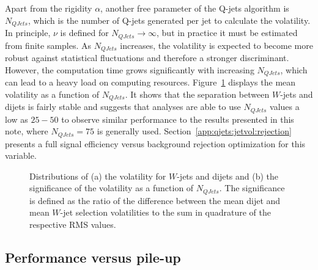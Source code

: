 Apart from the rigidity $\alpha$, another free parameter of the Q-jets algorithm is $N_{QJets}$, which is the number of Q-jets generated per jet to calculate the volatility. In principle, $\nu$ is defined for $N_{QJets}\to\infty$, but in practice it must be  estimated from finite samples. As $N_{QJets}$ increases, the volatility is expected to become more robust against statistical fluctuations and therefore a stronger discriminant. However, the computation time grows significantly with increasing $N_{QJets}$, which can lead to a heavy load on computing resources. Figure~\ref{fig:Vol_vs_NQJets} displays the mean volatility as a function of $N_{QJets}$. It shows that the separation between $W$-jets and dijets is fairly stable and suggests that analyses are able to use $N_{QJets}$ values a low as $25-50$ to observe similar performance to the results presented in this note, where $N_{QJets}=75$ is generally used. Section~\ref{app:qjets:jetvol:rejection} presents a full signal efficiency versus background rejection optimization for this variable. %

\begin{figure}[htbp]
\centering
{}
\caption{Distributions of (a) the volatility for $W$-jets and dijets and (b) the significance of the volatility  as a function of $N_{QJets}$. The significance is defined as the ratio of the difference between the mean dijet and mean $W$-jet selection volatilities to the sum in quadrature of the respective RMS values.}%
\label{fig:Vol_vs_NQJets}
\end{figure}

\subsection{Performance versus pile-up}
\label{app:qjets:jetvol:pileup}

